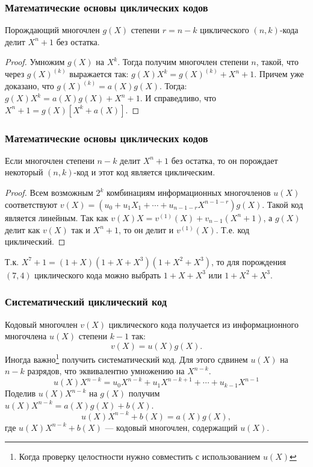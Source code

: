 \begin{frame}
    \frametitle{Математические основы циклических кодов}
    
    \begin{theorem}
        \alert{Порождающий} многочлен $g(X)$ степени $r=n-k$ циклического $(n,k)$-кода делит $X^n+1$ без остатка.
    \end{theorem}
    
    \begin{proof}
        Умножим $g(X)$ на $X^k$. Тогда получим многочлен степени $n$, такой, что через $g(X)^{(k)}$ выражается так: $g(X)X^k = g(X)^{(k)} + X^n + 1$. Причем уже доказано, что $g(X)^{(k)}=a(X)g(X)$. Тогда: $g(X)X^k = a(X)g(X) + X^n + 1$. И справедливо, что $X^n + 1 = g(X)[X^k + a(X)]$.
    \end{proof}
\end{frame}


\begin{frame}
    \frametitle{Математические основы циклических кодов}
    
    \begin{theorem}
        Если многочлен степени $n-k$ делит $X^n+1$ без остатка, то он порождает некоторый $(n,k)$-код и этот код является \alert{циклическим}.
    \end{theorem}
    
    \begin{proof}
        Всем возможным $2^k$ комбинациям информационных многочленов $u(X)$ соответствуют $v(X) = (u_0 + u_1X_1 + \cdots + u_{n-1-r}X^{n-1-r})g(X)$. Такой код является \alert{линейным}. Так как $v(X)X=v^{(1)}(X) + v_{n-1}(X^n+1)$, а $g(X)$ делит как $v(X)$ так и $X^n+1$, то он делит и $v^{(1)}(X)$. Т.е. код \alert{циклический}.
    \end{proof}
    Т.к. $X^7+1=(1+X)(1+X+X^3)(1+X^2+X^3)$, то для порождения $(7,4)$ циклического кода можно выбрать $1+X+X^3$ или $1+X^2+X^3$.
\end{frame}


\begin{frame}
    \frametitle{Систематический циклический код}
    
    Кодовый многочлен $v(X)$ \alert{циклического} кода получается из информационного многочлена $u(X)$ степени $k-1$ так:
    \[v(X)=u(X)g(X).\]
    Иногда важно\footnote{Когда проверку целостности нужно совместить с использованием $u(X)$} получить \alert{систематический} код. Для этого сдвинем $u(X)$ на $n-k$ разрядов, что эквивалентно умножению на $X^{n-k}$.
    \[
        u(X)X^{n-k}=u_0X^{n-k}+u_1X^{n-k+1}+\cdots+u_{k-1}X^{n-1}
    \]
    Поделив $u(X)X^{n-k}$ на $g(X)$ получим $u(X)X^{n-k} = a(X)g(X) + b(X)$.
    \[u(X)X^{n-k}+b(X) = a(X)g(X),\]
    где $u(X)X^{n-k}+b(X)$ --- кодовый многочлен, содержащий $u(X)$.
\end{frame}


